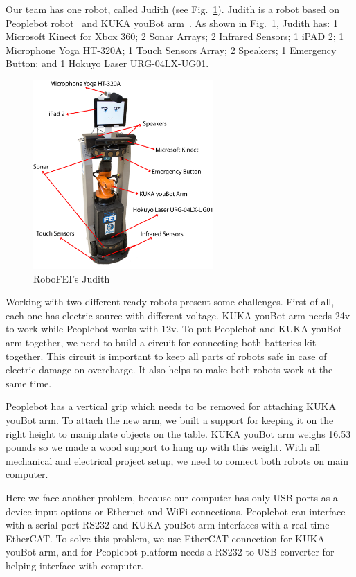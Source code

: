 Our team has one robot, called Judith (see Fig.~\ref{fig:judith}). Judith is a robot based on Peoplebot robot~\cite{peoplebot:2001} and KUKA youBot arm~\cite{youbot:2016}. As shown in Fig.~\ref{fig:judith}, Judith has: 1 Microsoft Kinect for Xbox 360; 2 Sonar Arrays; 2 Infrared Sensors; 1 iPAD 2; 1 Microphone Yoga HT-320A; 1 Touch Sensors Array; 2 Speakers; 1 Emergency Button; and 1 Hokuyo Laser URG-04LX-UG01.

\begin{figure}[ht!]
    \centering
    \includegraphics[height = 7.2cm]{figures/judith_info.png}
    \caption{RoboFEI's Judith}
    \label{fig:judith}
\end{figure}

Working with two different ready robots present some challenges. First of all, each one has electric source with different voltage. KUKA youBot arm needs 24v to work while Peoplebot works with 12v. To put Peoplebot and KUKA youBot arm together, we need to build a circuit for connecting both batteries kit together. This circuit is important to keep all parts of robots safe in case of electric damage on overcharge. It also helps to make both robots work at the same time.

Peoplebot has a vertical grip which needs to be removed for attaching KUKA youBot arm. To attach the new arm, we built a support for keeping it on the right height to manipulate objects on the table. KUKA youBot arm weighs 16.53 pounds so we made a wood support to hang up with this weight. With all mechanical and electrical project setup, we need to connect both robots on main computer.

Here we face another problem, because our computer has only USB ports as a device input options or Ethernet and WiFi connections. Peoplebot can interface with a serial port RS232 and KUKA youBot arm interfaces with a real-time EtherCAT. To solve this problem, we use EtherCAT connection for KUKA youBot arm, and for Peoplebot platform needs a RS232 to USB converter for helping interface with computer.

